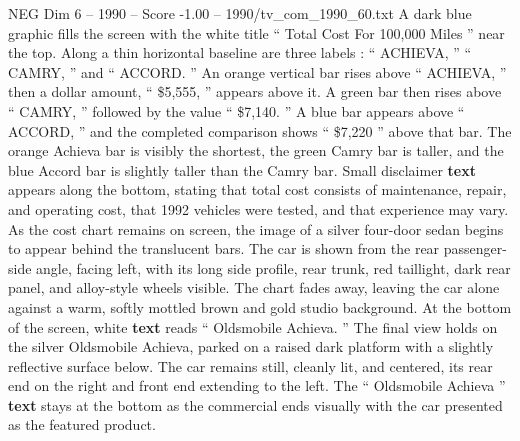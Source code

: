 \begin{textsample}{NEG Dim 6 – 1990 – Score -1.00 – 1990/tv\_com\_1990\_60.txt}  \label{ex:f6_neg_023}
A dark blue graphic fills the screen with the white title “ Total Cost For 100,000 Miles ” near the top.
Along a thin horizontal baseline are three labels : “ ACHIEVA, ” “ CAMRY, ” and “ ACCORD. ” An orange vertical bar rises above “ ACHIEVA, ” then a dollar amount, “ \$5,555, ” appears above it.
A green bar then rises above “ CAMRY, ” followed by the value “ \$7,140. ” A blue bar appears above “ ACCORD, ” and the completed comparison shows “ \$7,220 ” above that bar.
The orange Achieva bar is visibly the shortest, the green Camry bar is taller, and the blue Accord bar is slightly taller than the Camry bar.
Small disclaimer \textbf{text} appears along the bottom, stating that total cost consists of maintenance, repair, and operating cost, that 1992 vehicles were tested, and that experience may vary.
As the cost chart remains on screen, the image of a silver four-door sedan begins to appear behind the translucent bars.
The car is shown from the rear passenger-side angle, facing left, with its long side profile, rear trunk, red taillight, dark rear panel, and alloy-style wheels visible.
The chart fades away, leaving the car alone against a warm, softly mottled brown and gold studio background.
At the bottom of the screen, white \textbf{text} reads “ Oldsmobile Achieva. ” The final view holds on the silver Oldsmobile Achieva, parked on a raised dark platform with a slightly reflective surface below.
The car remains still, cleanly lit, and centered, its rear end on the right and front end extending to the left.
The “ Oldsmobile Achieva ” \textbf{text} stays at the bottom as the commercial ends visually with the car presented as the featured product.

\end{textsample}
